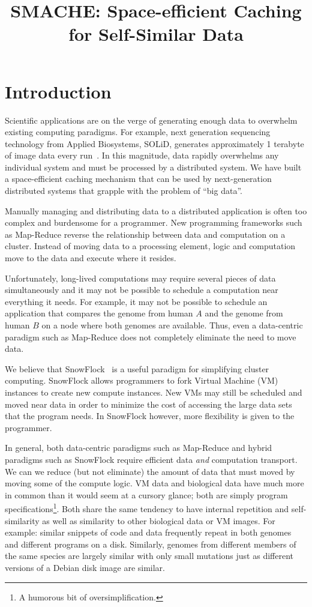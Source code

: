 \documentclass{sigplanconf}[11pt]
\title{SMACHE: Space-efficient Caching for Self-Similar Data}
\begin{document}
\maketitle

\section{Introduction}

Scientific applications are on the verge of generating enough data to overwhelm
existing computing paradigms.  For example, next generation sequencing
technology from Applied Biosystems, SOLiD, generates approximately 1 terabyte
of image data every run~\cite{ab}.  In this magnitude, data rapidly overwhelms
any individual system and must be processed by a distributed system.  We have
built a space-efficient caching mechanism that can be used by next-generation
distributed systems that grapple with the problem of ``big data''.

Manually managing and distributing data to a distributed application is often
too complex and burdensome for a programmer.  New programming frameworks such
as Map-Reduce reverse the relationship between data and computation on a
cluster.  Instead of moving data to a processing element, logic and computation
move to the data and execute where it resides.

Unfortunately, long-lived computations may require several pieces of data
simultaneously and it may not be possible to schedule a computation near
everything it needs.  For example, it may not be possible to schedule an
application that compares the genome from human $A$ and the genome from human
$B$ on a node where both genomes are available.  Thus, even a data-centric
paradigm such as Map-Reduce does not completely eliminate the need to move
data.

We believe that SnowFlock~\cite{snowflock} is a useful paradigm for simplifying
cluster computing.  SnowFlock allows programmers to fork Virtual Machine (VM)
instances to create new compute instances.  New VMs may still be scheduled and
moved near data in order to minimize the cost of accessing the large data sets
that the program needs.  In SnowFlock however, more flexibility is given to the
programmer.

In general, both data-centric paradigms such as Map-Reduce and hybrid paradigms
such as SnowFlock require efficient data {\em and} computation transport.  We
can we reduce (but not eliminate) the amount of data that must moved by moving
some of the compute logic.  VM data and biological data have much more in
common than it would seem at a cursory glance; both are simply program
specifications\footnote{A humorous bit of oversimplification.}.  Both share the
same tendency to have internal repetition and self-similarity as well as
similarity to other biological data or VM images.  For example: similar
snippets of code and data frequently repeat in both genomes~\cite{biosequence}
and different programs on a disk.  Similarly, genomes from different members of
the same species are largely similar with only small mutations just as
different versions of a Debian disk image are similar.
\end{document}
